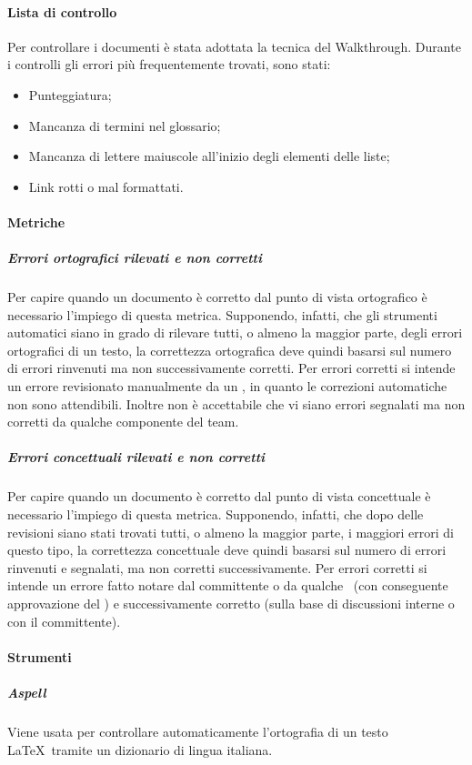 \documentclass[../NormeDiProgetto_v3.0.0.tex]{subfiles}
\begin{document}
			\paragraph{Lista di controllo}
				Per controllare i documenti è stata adottata la tecnica del Walkthrough.
				Durante i controlli gli errori più frequentemente trovati, sono stati:
				\begin{itemize}
					\item Punteggiatura;
					\item Mancanza di termini nel glossario;
					\item Mancanza di lettere maiuscole all'inizio degli elementi delle liste;
					\item Link rotti o mal formattati.
				\end{itemize}

			\paragraph{Metriche}

				\subparagraph{Errori ortografici rilevati e non corretti}
				Per capire quando un documento è corretto dal punto di vista ortografico è necessario l'impiego di questa metrica. Supponendo, infatti, che gli strumenti automatici siano in grado di rilevare tutti, o almeno la maggior parte, degli errori ortografici di un testo, la correttezza ortografica deve quindi basarsi sul numero di errori rinvenuti ma non successivamente corretti. Per errori corretti si intende un errore revisionato manualmente da un \verificatore, in quanto le correzioni automatiche non sono attendibili. Inoltre non è accettabile che vi siano errori segnalati ma non corretti da qualche componente del team.

				\subparagraph{Errori concettuali rilevati e non corretti}
				Per capire quando un documento è corretto dal punto di vista concettuale è necessario l'impiego di questa metrica. Supponendo, infatti, che dopo delle revisioni siano stati trovati tutti, o almeno la maggior parte, i maggiori errori di questo tipo, la correttezza concettuale deve quindi basarsi sul numero di errori rinvenuti e segnalati, ma non corretti successivamente. Per errori corretti si intende un errore fatto notare dal committente o da qualche \verificatore\ (con conseguente approvazione del \responsabilediprogetto) e successivamente corretto (sulla base di discussioni interne o con il committente).\\

			\paragraph{Strumenti}
				\subparagraph{Aspell}
				Viene usata per controllare automaticamente l'ortografia di un testo \LaTeX\ tramite un dizionario di lingua italiana.
\end{document}

